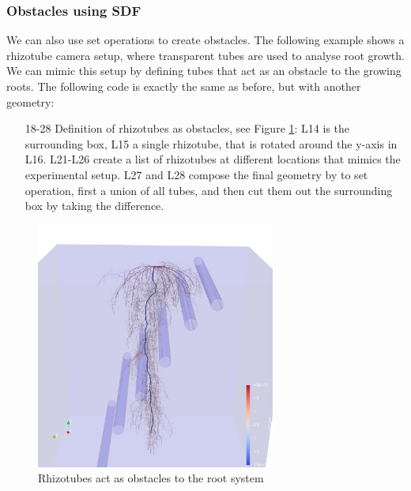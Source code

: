 \subsubsection*{Obstacles using SDF}

We can also use set operations to create obstacles. The following example shows a rhizotube camera setup, where transparent tubes are used to analyse root growth. We can mimic this setup by defining tubes that act as an obstacle to the growing roots. The following code is exactly the same as before, but with another geometry: 



\begin{itemize}
\item[18-28] Definition of rhizotubes as obstacles, see Figure \ref{fig:topics_virtual3}: L14 is the surrounding box, L15 a single rhizotube, that is rotated around the y-axis in L16. L21-L26 create a list of rhizotubes at different locations that mimics the experimental setup.  L27 and L28 compose the final geometry by to set operation, first a union of all tubes, and then cut them out the surrounding box by taking the difference. 
\end{itemize}

\begin{figure}
\centering
\includegraphics[width=0.7\textwidth]{figures/topics_virtual3.png}
\caption{Rhizotubes act as obstacles to the root system} \label{fig:topics_virtual3}
\end{figure}

